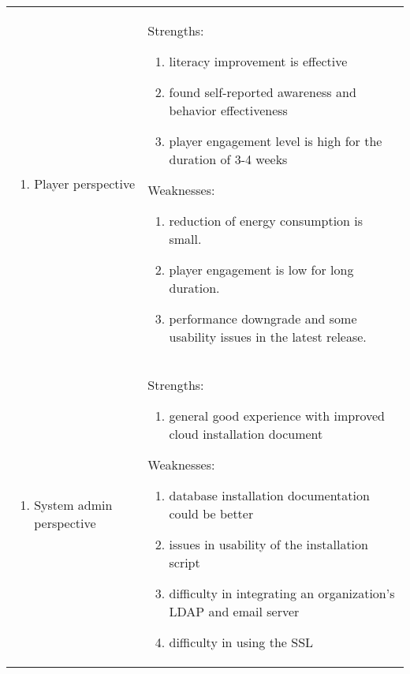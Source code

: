 \begin{table}[ht!]
  \centering
  \begin{tabular}{|P{0.15\columnwidth}|P{0.78\columnwidth}|}
    \hline
     &
     \\
    \hline
    \begin{enumerate}[label={}, nosep, leftmargin=*]
    \item Player perspective 
    \end{enumerate}
    & 
    Strengths:
    \begin{enumerate}[nosep, leftmargin=*]
    \item literacy improvement is effective 
    \item found self-reported awareness and behavior effectiveness 
    \item player engagement level is high for the duration of 3-4 weeks
    \end{enumerate}               
     Weaknesses:
    \begin{enumerate}[nosep, leftmargin=*]
     \item reduction of energy consumption is small.
     \item player engagement is low for long duration.
     \item performance downgrade and some usability issues in the latest release.
     \end{enumerate}  \\
    \hline
    \begin{enumerate}[label={}, nosep, leftmargin=*]
    \item System admin perspective 
    \end{enumerate}
    & 
    Strengths:
    \begin{enumerate}[label={}, nosep, leftmargin=*]
    \item general good experience with improved cloud installation document 
    \end{enumerate}               
    Weaknesses:
    \begin{enumerate}[nosep, leftmargin=*]
    \item database installation documentation could be better
    \item issues in usability of the installation script
    \item difficulty in integrating an organization's LDAP and email server
    \item difficulty in using the SSL
    \end{enumerate} \\

\end{tabular}
\end{table}
